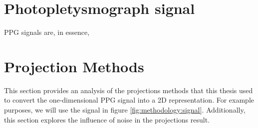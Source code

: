 


\section{Photopletysmograph signal}

\gls{PPG} signals are, in essence, 


%



\section{Projection Methods}

This section provides an analysis of the projections methods that this thesis used to convert the one-dimensional \gls{PPG} signal into a 2D representation. For example purposes, we will use the signal in figure \ref{fig:methodology:signal}. Additionally, this section explores the influence of noise in the projections result. 




